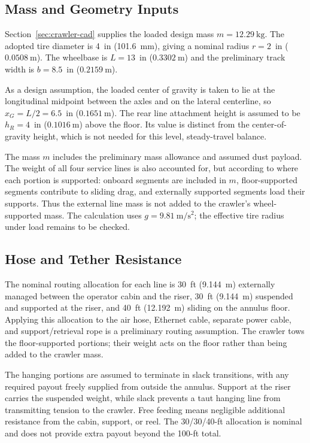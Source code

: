 \subsection{Mass and Geometry Inputs}
Section~\ref{sec:crawler-cad} supplies the loaded design mass $m=12.29~\mathrm{kg}$. The adopted tire diameter is 4~in (101.6~mm), giving a nominal radius $r=2$~in ($0.0508~\mathrm{m}$). The wheelbase is $L=13$~in ($0.3302~\mathrm{m}$) and the preliminary track width is $b=8.5$~in ($0.2159~\mathrm{m}$).

As a design assumption, the loaded center of gravity is taken to lie at the longitudinal midpoint between the axles and on the lateral centerline, so $x_G=L/2=6.5$~in ($0.1651~\mathrm{m}$). The rear line attachment height is assumed to be $h_R=4$~in ($0.1016~\mathrm{m}$) above the floor. Its value is distinct from the center-of-gravity height, which is not needed for this level, steady-travel balance.

The mass $m$ includes the preliminary mass allowance and assumed dust payload. The weight of all four service lines is also accounted for, but according to where each portion is supported: onboard segments are included in $m$, floor-supported segments contribute to sliding drag, and externally supported segments load their supports. Thus the external line mass is not added to the crawler's wheel-supported mass. The calculation uses $g=9.81~\mathrm{m/s^2}$; the effective tire radius under load remains to be checked.

\subsection{Hose and Tether Resistance}
\label{sec:service-bundle-routing}
The nominal routing allocation for each line is 30~ft (9.144~m) externally managed between the operator cabin and the riser, 30~ft (9.144~m) suspended and supported at the riser, and 40~ft (12.192~m) sliding on the annulus floor. Applying this allocation to the air hose, Ethernet cable, separate power cable, and support/retrieval rope is a preliminary routing assumption. The crawler tows the floor-supported portions; their weight acts on the floor rather than being added to the crawler mass.

The hanging portions are assumed to terminate in slack transitions, with any required payout freely supplied from outside the annulus. Support at the riser carries the suspended weight, while slack prevents a taut hanging line from transmitting tension to the crawler. Free feeding means negligible additional resistance from the cabin, support, or reel. The 30/30/40-ft allocation is nominal and does not provide extra payout beyond the 100-ft total.

